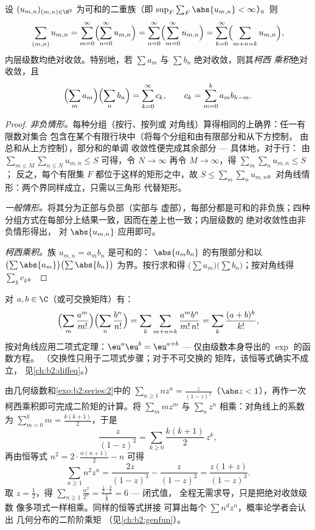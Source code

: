 \begin{theorem}\label{thm:b2:series:fubini}
设 $(u_{m,n})_{(m,n) \in \N^2}$ 为可和的二重族（即
$\sup_F \sum_F \abs{u_{m,n}} < \infty$）。则
\[
\sum_{(m,n)} u_{m,n}
= \sum_{m=0}^{\infty}\Bigl(\sum_{n=0}^{\infty} u_{m,n}\Bigr)
= \sum_{n=0}^{\infty}\Bigl(\sum_{m=0}^{\infty} u_{m,n}\Bigr)
= \sum_{k=0}^{\infty}\Bigl(\sum_{m+n=k} u_{m,n}\Bigr),
\]
内层级数均绝对收敛。特别地，若 $\sum
a_m$ 与 $\sum b_n$ 绝对收敛，则其\emph{柯西
乘积}绝对收敛，且
\[
\Bigl(\sum_m a_m\Bigr)\Bigl(\sum_n b_n\Bigr)
= \sum_{k=0}^{\infty} c_k,
\qquad
c_k = \sum_{m=0}^{k} a_m b_{k-m} .
\]
\end{theorem}

\begin{proof}
\emph{非负情形。}每种分组（按行、按列或
对角线）算得相同的上确界：任一有限数对集合
包含在某个有限行块中（将每个分组和由有限部分和从下方控制，
由总和从上方控制），部分和的单调
收敛性便完成其余部分 --- 具体地，对于行：
由 $\sum_{m \leq M}\sum_{n \leq N} u_{m,n} \leq S$ 可得，令 $N
\to \infty$ 再令 $M \to \infty$，得 $\sum_m \sum_n u_{m,n} \leq S$；
反之，每个有限集 $F$ 都位于这样的矩形之中，故 $S \leq
\sum_m\sum_n u_{m,n}$。对角线情形：两个界同样成立，只需以三角形
代替矩形。

\emph{一般情形。}将其分为正部与负部（实部与
虚部），每部分都是可和的非负族；四种
分组方式在每部分上结果一致，因而在差上也一致；内层级数的
绝对收敛性由非负情形得出，
对 $\abs{u_{m,n}}$ 应用即可。

\emph{柯西乘积。}族 $u_{m,n} = a_m b_n$ 是可和的：
$\abs{a_mb_n}$ 的有限部分和以
$\bigl(\sum\abs{a_m}\bigr)\bigl(\sum\abs{b_n}\bigr)$ 为界。按行求和得
$\bigl(\sum a_m\bigr)\bigl(\sum b_n\bigr)$；按对角线得 $\sum_k
c_k$。
\end{proof}

\begin{example}[指数恒等式的严格处理]\label{ex:b2:series:exp}
对 $a, b \in \C$（或可交换矩阵）有：
\[
\Bigl(\sum_m \frac{a^m}{m!}\Bigr)\Bigl(\sum_n
\frac{b^n}{n!}\Bigr)
= \sum_k \sum_{m+n=k} \frac{a^m b^n}{m!\,n!}
= \sum_k \frac{(a + b)^k}{k!},
\]
按对角线应用二项式定理：$\eu^a \eu^b = \eu^{a+b}$
--- 仅由级数本身导出的 $\exp$ 的函数方程。
（交换性只用于二项式步骤；对于不可交换的
矩阵，该恒等式确实不成立，
见\cref{ch:b2:diffeq}。）
\end{example}

\begin{example}[作为计算工具的柯西乘积]\label{ex:b2:series:squaresum}
由几何级数和\cref{exo:b2:series:2}中的 $\sum_{n
\geq 1} nz^n = \frac{z}{(1-z)^2}$（$\abs z < 1$），再作一次
柯西乘积即可完成二阶矩的计算。将 $\sum_m
mz^m$ 与 $\sum_n z^n$ 相乘：对角线上的系数为 $\sum_{m=0}^k
m = \frac{k(k+1)}2$，于是
\[
\frac{z}{(1-z)^3} = \sum_{k\geq0}\frac{k(k+1)}{2}\,z^k ,
\]
再由恒等式 $n^2 = 2\cdot\frac{n(n+1)}2 - n$ 可得
\[
\sum_{n\geq1} n^2z^n = \frac{2z}{(1-z)^3} - \frac{z}{(1-z)^2}
= \frac{z(1+z)}{(1-z)^3} .
\]
取 $z = \frac12$，得 $\sum_{n\geq1}\frac{n^2}{2^n} =
\frac{\frac12\cdot\frac32}{\frac18} = 6$ --- 闭式值，
全程无需求导，只是把绝对收敛级数
像多项式一样相乘。同样的恒等式拼接
可算出每个 $\sum n^dz^n$，概率论学者会认出
几何分布的二阶阶乘矩
（见\cref{ch:b2:genfun}）。
\end{example}


